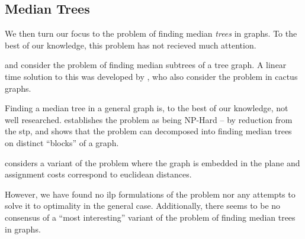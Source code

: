  \subsection{Median Trees}
 We then turn our focus to the problem of finding median \textit{trees} in graphs.
  To the best of our knowledge, this problem has not recieved much attention.

  \citet{minieka1985optimal} and \citet{george2003bi} consider the problem of finding
  median subtrees of a tree graph.
  A linear time solution to this was developed by
  \citet{kim1991locating}, who also consider the problem in cactus graphs.

  Finding a median tree in a general graph is, to the best of our knowledge, not well researched.
 \citet{aneja1992location} establishes the
  problem as being NP-Hard -- by reduction from the \gls{stp}, and shows that the problem can
  decomposed into finding median trees on distinct ``blocks'' of a graph.

  \citet{kim1991locating} considers a variant of the problem where the graph is embedded in the plane
  and assignment costs correspond to euclidean distances.
  
  However, we have found no \gls{ilp} formulations of the problem nor any attempts to solve it to optimality
  in the general case. Additionally, there seems to be no consensus of a ``most interesting'' variant
  of the problem of finding median trees in graphs.

  


